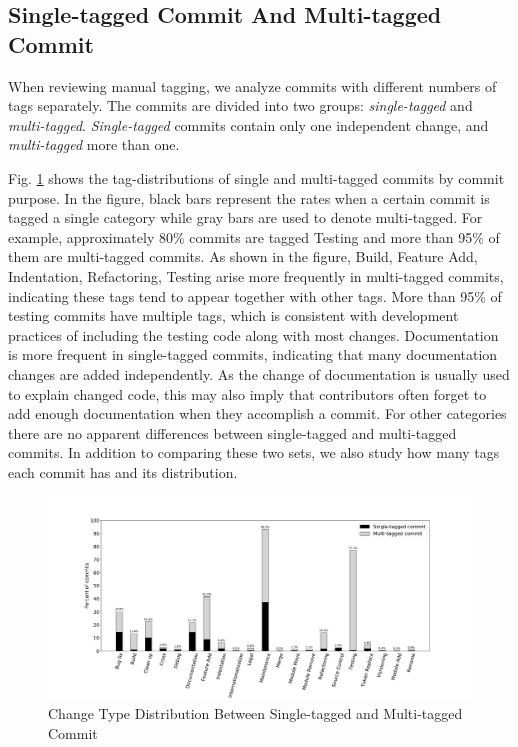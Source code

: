 \subsection{Single-tagged Commit And Multi-tagged Commit}

When reviewing manual tagging, we analyze commits with different numbers of tags separately. 
The commits are divided into two groups: \textit{single-tagged} and \textit{multi-tagged}. \textit{Single-tagged} commits contain only one independent change, and \textit{multi-tagged} more than one. 

Fig. \ref{fig: cat_distribution} shows the tag-distributions of single and multi-tagged commits by commit purpose.
In the figure, black bars represent the rates when a certain commit is tagged a single category while gray bars are used to denote multi-tagged. For example, approximately 80\% commits are tagged Testing and more than 95\% of them are multi-tagged commits.
As shown in the figure, Build, Feature Add, Indentation, Refactoring, Testing arise more frequently in multi-tagged commits, indicating these tags tend to appear together with other tags. 
More than 95\% of testing commits have multiple tags, which is consistent with development practices of including the testing code along with most changes.
Documentation is more frequent in single-tagged commits, indicating that many documentation changes are added independently.
As the change of documentation is usually used to explain changed code, this may also imply that contributors often forget to add enough documentation when they accomplish a commit.
For other categories there are no apparent differences between single-tagged and multi-tagged commits.
In addition to comparing these two sets, we also study how many tags each commit has and its distribution. 
\begin{figure}[htbp]
\centerline{\includegraphics[scale=0.30]{figures/cat_distribution_over_s&m_commits.pdf}}
\caption{Change Type Distribution Between Single-tagged and Multi-tagged Commit}
\label{fig: cat_distribution}
\end{figure}



